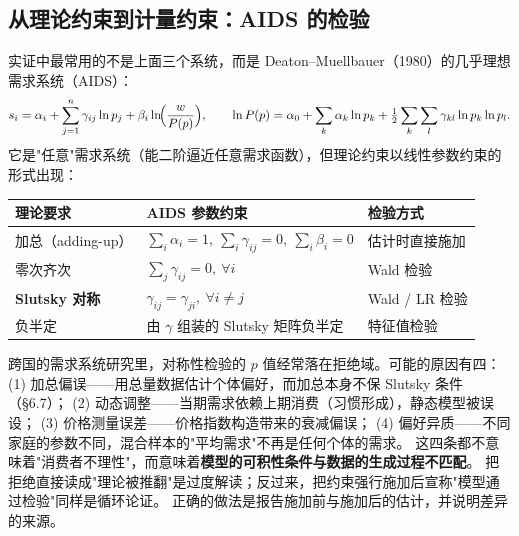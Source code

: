 \subsection{从理论约束到计量约束：AIDS 的检验}

实证中最常用的不是上面三个系统，而是 Deaton--Muellbauer（1980）的几乎理想需求系统（AIDS）：
\[
 s_i=\alpha_i+\sum_{j=1}^{n}\gamma_{ij}\ln p_j+\beta_i\ln\!\Bigl(\frac{w}{P(p)}\Bigr),
 \qquad
 \ln P(p)=\alpha_0+\sum_k\alpha_k\ln p_k+\tfrac12\sum_{k}\sum_{l}\gamma_{kl}\ln p_k\ln p_l .
\]
它是"任意"需求系统（能二阶逼近任意需求函数），但理论约束以线性参数约束的形式出现：

\begin{center}
\begin{tabular}{lll}
\toprule
理论要求 & AIDS 参数约束 & 检验方式\\
\midrule
加总（adding-up） & $\sum_i\alpha_i=1,\ \sum_i\gamma_{ij}=0,\ \sum_i\beta_i=0$ & 估计时直接施加\\
零次齐次 & $\sum_j\gamma_{ij}=0,\ \forall i$ & Wald 检验\\
\textbf{Slutsky 对称} & $\gamma_{ij}=\gamma_{ji},\ \forall i\ne j$ & Wald / LR 检验\\
负半定 & 由 $\gamma$ 组装的 Slutsky 矩阵负半定 & 特征值检验\\
\bottomrule
\end{tabular}
\end{center}

\begin{remark}
跨国的需求系统研究里，对称性检验的 $p$ 值经常落在拒绝域。可能的原因有四：
(1) 加总偏误——用总量数据估计个体偏好，而加总本身不保 Slutsky 条件（\S 6.7）；
(2) 动态调整——当期需求依赖上期消费（习惯形成），静态模型被误设；
(3) 价格测量误差——价格指数构造带来的衰减偏误；
(4) 偏好异质——不同家庭的参数不同，混合样本的"平均需求"不再是任何个体的需求。
这四条都不意味着"消费者不理性"，而意味着\textbf{模型的可积性条件与数据的生成过程不匹配}。
把拒绝直接读成"理论被推翻"是过度解读；反过来，把约束强行施加后宣称"模型通过检验"同样是循环论证。
正确的做法是报告施加前与施加后的估计，并说明差异的来源。
\end{remark}
